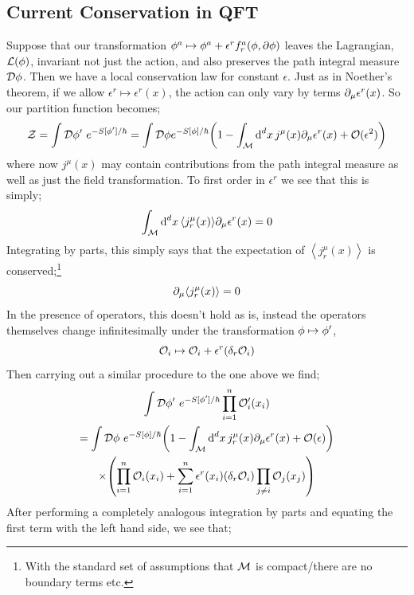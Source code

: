 \subsection{Current Conservation in QFT}
Suppose that our transformation $\phi^a \mapsto \phi^a + \epsilon^r f_r^a(\phi, \partial \phi)$ leaves the Lagrangian, $\mathcal{L}(\phi)$, invariant not just the action, and also preserves the path integral measure $\mathcal{D} \phi$. Then we have a local conservation law for constant $\epsilon$. Just as in Noether's theorem, if we allow $\epsilon^r \mapsto \epsilon^r(x)$, the action can only vary by terms $\partial_\mu \epsilon^r(x)$. So our partition function becomes;
\begin{equation*}
\mZ = \int{\mD \phi\pr \,\, e^{-S[\phi\pr]/\hbar}} = \int{\mD \phi e^{-S[\phi]/\hbar}\left(1 - \int_{\mM}{\upd{^d x}j^\mu(x)\del_\mu \epsilon^r(x)} + \mO(\epsilon^2)\right)}
\end{equation*}
where now $j^{\mu}(x)$ may contain contributions from the path integral measure as well as just the field transformation. To first order in $\epsilon^r$ we see that this is simply;
\begin{equation*}
\int_{\mM}{\upd{^d x}\left< j^{\mu}_r(x) \right>\del_\mu \epsilon^r(x)} = 0
\end{equation*}
Integrating by parts, this simply says that the expectation of $\left< j^{\mu}_r(x) \right>$ is conserved;\footnote{With the standard set of assumptions that $\mathcal{M}$ is compact/there are no boundary terms etc.}
\begin{equation}
\del_\mu \left< j^{\mu}_r(x) \right> = 0
\end{equation}
In the presence of operators, this doesn't hold as is, instead the operators themselves change infinitesimally under the transformation $\phi \mapsto \phi^{\prime}$, 
\begin{equation*}
\mathcal{O}_i \mapsto \mathcal{O}_i + \epsilon^r (\delta_r \mathcal{O}_i)
\end{equation*}
Then carrying out a similar procedure to the one above we find;
\begin{multline*}
\int{\mD\phi\pr\,\,e^{-S[\phi\pr]/\hbar}\prod_{i = 1}^{n}{\mO\pr_i(x_i)}} \\ = \int{\mD \phi\,\,e^{-S[\phi]/\hbar}\left(1 - \int_{\mM}{\upd{^d x}j^\mu_r(x)\del_\mu \epsilon^r(x)} + \mO(\epsilon)\right)} \\ \times \left(\prod_{i = 1}^{n}{\mO_i(x_i)} + \sum_{i = 1}^{n}\epsilon^r(x_i)(\delta_r\mO_i)\prod_{j \neq i}{\mO_j(x_j)}\right)
\end{multline*}
After performing a completely analogous integration by parts and equating the first term with the left hand side, we see that;

